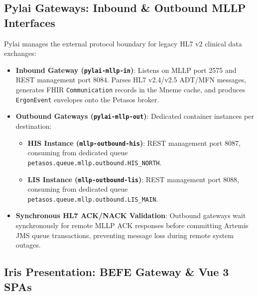 \subsection{Pylai Gateways: Inbound \& Outbound MLLP Interfaces}

Pylai manages the external protocol boundary for legacy HL7 v2 clinical data exchanges:
\begin{itemize}
    \item \textbf{Inbound Gateway (\texttt{pylai-mllp-in})}: Listens on MLLP port 2575 and REST management port 8084. Parses HL7 v2.4/v2.5 ADT/MFN messages, generates FHIR \texttt{Communication} records in the Mneme cache, and produces \texttt{ErgonEvent} envelopes onto the Petasos broker.
    \item \textbf{Outbound Gateways (\texttt{pylai-mllp-out})}: Dedicated container instances per destination:
    \begin{itemize}
        \item \textbf{HIS Instance (\texttt{mllp-outbound-his})}: REST management port 8087, consuming from dedicated queue \texttt{petasos.queue.mllp.outbound.HIS\_NORTH}.
        \item \textbf{LIS Instance (\texttt{mllp-outbound-lis})}: REST management port 8088, consuming from dedicated queue \texttt{petasos.queue.mllp.outbound.LIS\_MAIN}.
    \end{itemize}
    \item \textbf{Synchronous HL7 ACK/NACK Validation}: Outbound gateways wait synchronously for remote MLLP ACK responses before committing Artemis JMS queue transactions, preventing message loss during remote system outages.
\end{itemize}

\subsection{Iris Presentation: BEFE Gateway \& Vue 3 SPAs}

